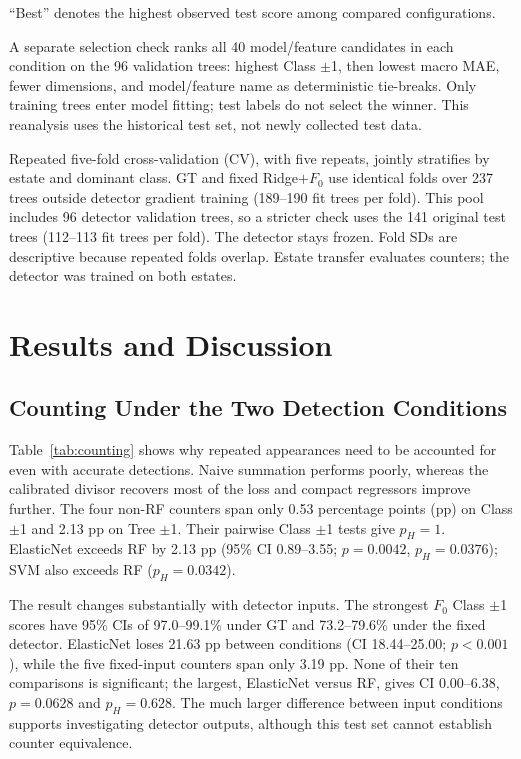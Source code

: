 \documentclass[conference,a4paper]{IEEEtran}
\begin{document}
``Best'' denotes the highest observed test score among compared configurations.

A separate selection check ranks all 40 model/feature candidates in each
condition on the 96 validation trees: highest Class $\pm$1, then lowest
macro MAE, fewer dimensions, and model/feature name as deterministic tie-breaks.
Only training trees enter model fitting; test labels do not select the winner.
This reanalysis uses the historical test set, not newly collected test data.

Repeated five-fold cross-validation (CV), with five repeats, jointly stratifies
by estate and dominant class. GT and fixed Ridge$+F_0$ use identical folds
over 237 trees outside detector gradient training (189--190 fit trees per fold).
This pool includes 96 detector validation trees, so a stricter check uses
the 141 original test trees (112--113 fit trees per fold). The detector stays
frozen. Fold SDs are descriptive because repeated folds overlap. Estate transfer
evaluates counters; the detector was trained on both estates.

\section{Results and Discussion}
\subsection{Counting Under the Two Detection Conditions}
\label{sec:gt}
Table~\ref{tab:counting} shows why repeated appearances need to be accounted
for even with accurate detections. Naive summation performs poorly, whereas
the calibrated divisor recovers most of the loss and compact regressors improve
further. The four non-RF counters span only 0.53 percentage points (pp) on Class
$\pm$1 and 2.13 pp on Tree $\pm$1. Their pairwise Class $\pm$1 tests give
$p_H=1$. ElasticNet exceeds RF by 2.13 pp (95\% CI 0.89--3.55;
$p=0.0042$, $p_H=0.0376$); SVM also exceeds RF ($p_H=0.0342$).

The result changes substantially with detector inputs. The strongest $F_0$
Class $\pm$1 scores have 95\% CIs of 97.0--99.1\% under GT and 73.2--79.6\%
under the fixed detector. ElasticNet loses 21.63 pp between conditions
(CI 18.44--25.00; $p<0.001$), while the five fixed-input counters span only
3.19 pp. None of their ten comparisons is significant; the largest, ElasticNet
versus RF, gives CI 0.00--6.38, $p=0.0628$ and $p_H=0.628$.
The much larger difference between input conditions supports investigating
detector outputs, although this test set cannot establish counter equivalence.
\end{document}
